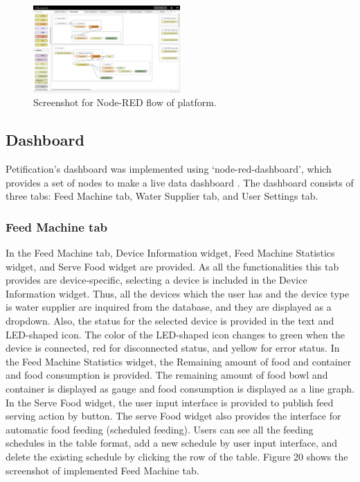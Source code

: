 \documentclass[conference]{IEEEtran}
\begin{document}
\begin{figure}[htbp]
\centerline{\includegraphics[width=0.5\textwidth]{./images/platformImpl.png}}
\caption{Screenshot for Node-RED flow of platform.}
\label{fig}
\end{figure}

\subsection{Dashboard}
Petification’s dashboard was implemented using ‘node-red-dashboard’, which provides a set of nodes to make a live data dashboard \cite{b19}.
The dashboard consists of three tabs: Feed Machine tab, Water Supplier tab, and User Settings tab. \\

\subsubsection{Feed Machine tab}
In the Feed Machine tab, Device Information widget, Feed Machine Statistics widget, and Serve Food widget are provided. As all the functionalities this tab provides are device-specific, selecting a device is included in the Device Information widget. Thus, all the devices which the user has and the device type is water supplier are inquired from the database, and they are displayed as a dropdown. Also, the status for the selected device is provided in the text and LED-shaped icon. The color of the LED-shaped icon changes to green when the device is connected, red for disconnected status, and yellow for error status. In the Feed Machine Statistics widget, the Remaining amount of food and container and food consumption is provided. The remaining amount of food bowl and container is displayed as gauge and food consumption is displayed as a line graph. In the Serve Food widget, the user input interface is provided to publish feed serving action by button. The serve Food widget also provides the interface for automatic food feeding (scheduled feeding). Users can see all the feeding schedules in the table format, add a new schedule by user input interface, and delete the existing schedule by clicking the row of the table. Figure 20
shows the screenshot of implemented Feed Machine tab.
\end{document}
